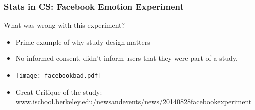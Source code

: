 \documentclass[mathserif]{beamer}
\begin{document}
\begin{frame}[t]
\frametitle{Stats in CS: Facebook Emotion Experiment}
What was wrong with this experiment?  

\begin{itemize}
	\item<2->{Prime example of why study design matters}
	\item<2->{No informed consent, didn't inform users that they were part of a study. }
	\item<3->{
	\texttt{[image: facebookbad.pdf]}}
	\item<4->{Great Critique of the study:
	\footnotesize www.ischool.berkeley.edu/newsandevents/news/20140828facebookexperiment}
\end{itemize}
\end{frame}
\end{document}
